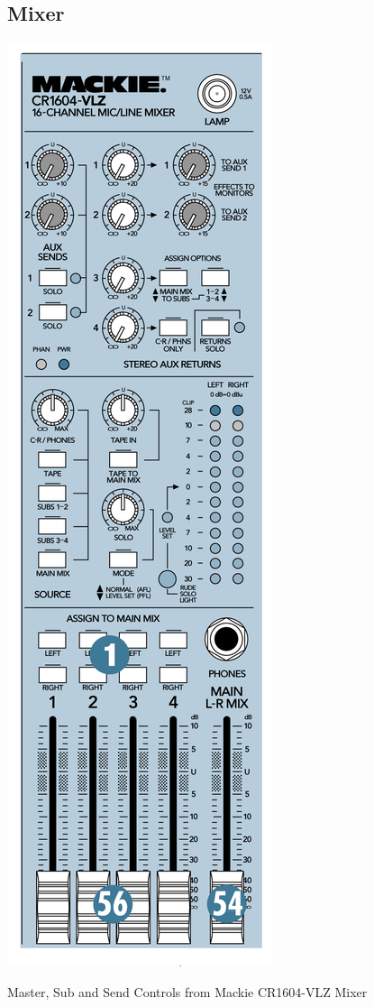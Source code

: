 \documentclass{tufte-book} %
\begin{document}


\newpage

\subsection{Mixer}

\begin{marginfigure}
\includegraphics[width=\linewidth]{Mackie_2.png}
\caption{Master, Sub and Send Controls from Mackie CR1604-VLZ Mixer}
\label{fig:marginfig}
\end{marginfigure}
\end{document}
